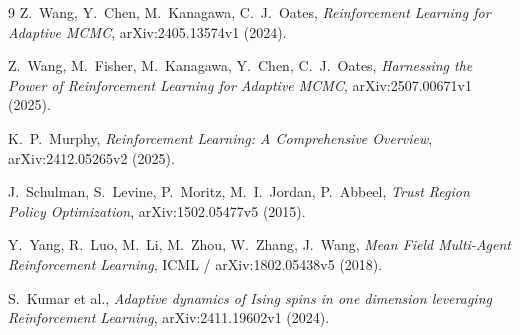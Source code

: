 \documentclass[10pt,a4paper]{article}
\begin{document}
\begin{thebibliography}{9}
Z.\ Wang, Y.\ Chen, M.\ Kanagawa, C.\ J.\ Oates, \textit{Reinforcement Learning for Adaptive MCMC}, arXiv:2405.13574v1 (2024).

Z.\ Wang, M.\ Fisher, M.\ Kanagawa, Y.\ Chen, C.\ J.\ Oates, \textit{Harnessing the Power of Reinforcement Learning for Adaptive MCMC}, arXiv:2507.00671v1 (2025).

K.\ P.\ Murphy, \textit{Reinforcement Learning: A Comprehensive Overview}, arXiv:2412.05265v2 (2025).

J.\ Schulman, S.\ Levine, P.\ Moritz, M.\ I.\ Jordan, P.\ Abbeel, \textit{Trust Region Policy Optimization}, arXiv:1502.05477v5 (2015).

Y.\ Yang, R.\ Luo, M.\ Li, M.\ Zhou, W.\ Zhang, J.\ Wang, \textit{Mean Field Multi-Agent Reinforcement Learning}, ICML / arXiv:1802.05438v5 (2018).

S.\ Kumar et al., \textit{Adaptive dynamics of Ising spins in one dimension leveraging Reinforcement Learning}, arXiv:2411.19602v1 (2024).
\end{thebibliography}
\end{document}
